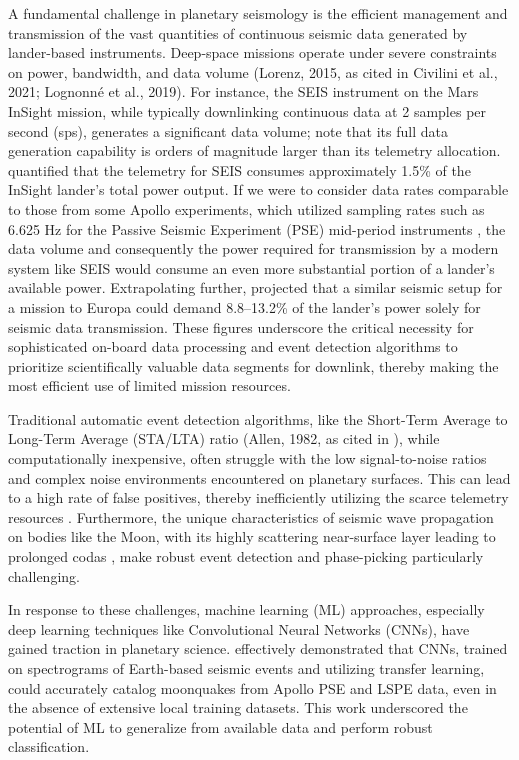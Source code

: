 \documentclass[conference]{IEEEtran}
\begin{document}
    A fundamental challenge in planetary seismology is the efficient management and transmission of the vast quantities
    of continuous seismic data generated by lander-based instruments. Deep-space missions operate under severe
    constraints on power, bandwidth, and data volume (Lorenz, 2015, as cited in Civilini et al., 2021; Lognonné et al.,
    2019). For instance, the SEIS instrument on the Mars InSight mission, while typically downlinking continuous data at
    2 samples per second (sps), generates a significant data volume; \cite{Lognonne2019} note that its full data
    generation capability is orders of magnitude larger than its telemetry allocation. \cite{Civilini2021} quantified
    that the telemetry for SEIS consumes approximately 1.5\% of the InSight lander's total power output. If we were to
    consider data rates comparable to those from some Apollo experiments, which utilized sampling rates such as 6.625 Hz
    for the Passive Seismic Experiment (PSE) mid-period instruments \cite{Nunn2020}, the data volume and consequently
    the power required for transmission by a modern system like SEIS would consume an even more substantial portion of a
    lander's available power. Extrapolating further, \cite{Civilini2021} projected that a similar seismic setup for a
    mission to Europa could demand 8.8–13.2\% of the lander's power solely for seismic data transmission. These figures
    underscore the critical necessity for sophisticated on-board data processing and event detection algorithms to
    prioritize scientifically valuable data segments for downlink, thereby making the most efficient use of limited
    mission resources.

    Traditional automatic event detection algorithms, like the Short-Term Average to Long-Term Average (STA/LTA) ratio
    (Allen, 1982, as cited in \cite{Civilini2021}), while computationally inexpensive, often struggle with the low
    signal-to-noise ratios and complex noise environments encountered on planetary surfaces. This can lead to a high
    rate of false positives, thereby inefficiently utilizing the scarce telemetry resources \cite{Civilini2021}.
    Furthermore, the unique characteristics of seismic wave propagation on bodies like the Moon, with its highly
    scattering near-surface layer leading to prolonged codas \cite{Dainty1981, Nakamura1982} , make robust event
    detection and phase-picking particularly challenging.

    In response to these challenges, machine learning (ML) approaches, especially deep learning techniques like
    Convolutional Neural Networks (CNNs), have gained traction in planetary science. \cite{Civilini2021} effectively
    demonstrated that CNNs, trained on spectrograms of Earth-based seismic events and utilizing transfer learning, could
    accurately catalog moonquakes from Apollo PSE and LSPE data, even in the absence of extensive local training
    datasets. This work underscored the potential of ML to generalize from available data and perform robust
    classification.
\end{document}
